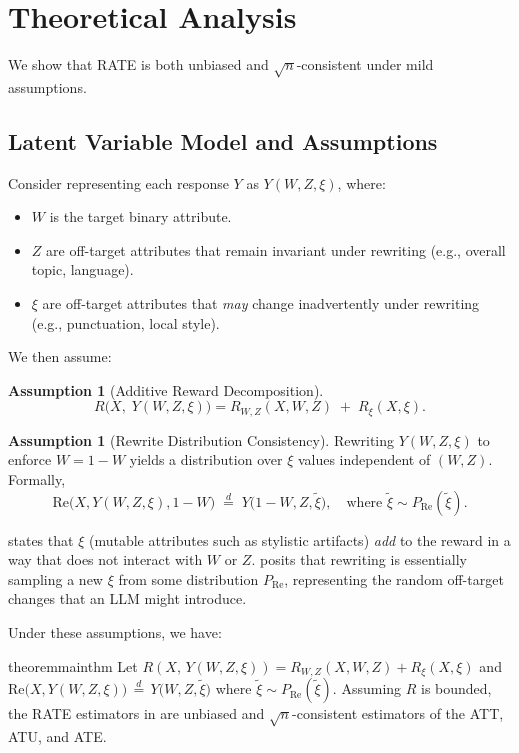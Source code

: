 \documentclass{article}
\theoremstyle{definition}
\newtheorem{assumption}[theorem]{Assumption}
\begin{document}
\section{Theoretical Analysis}
\label{sec:theory}

We show that RATE is both unbiased and $\sqrt{n}$-consistent under mild assumptions.

\subsection{Latent Variable Model and Assumptions}

Consider representing each response $Y$ as $Y(W, Z, \xi)$, where:
\begin{itemize}
    \item $W$ is the target binary attribute.
    \item $Z$ are off-target attributes that remain invariant under rewriting (e.g., overall topic, language).
    \item $\xi$ are off-target attributes that \emph{may} change inadvertently under rewriting (e.g., punctuation, local style).
\end{itemize}
We then assume:

\begin{assumption}[Additive Reward Decomposition]
\label{assump:additive}
\[
R\bigl(X,\;Y(W,Z,\xi)\bigr) = R_{W,Z}(X,W,Z) \;+\; R_{\xi}(X,\xi).
\]
\end{assumption}
\begin{assumption}[Rewrite Distribution Consistency]
\label{assump:rewrite_dist}
Rewriting $Y(W,Z,\xi)$ to enforce $W=1-W$ yields a distribution over $\xi$ values independent of $(W,Z)$. Formally,
\[
\text{Re}\bigl(X, Y(W,Z,\xi), 1 - W \bigr) \;\stackrel{d}{=}\; Y\bigl(1 - W,Z,\tilde{\xi}\bigr),
\quad\text{where } \tilde{\xi} \sim P_{\mathrm{Re}}(\tilde{\xi}).
\]
\end{assumption}
\noindent
{} states that $\xi$ (mutable attributes such as stylistic artifacts) \emph{add} to the reward in a way that does not interact with $W$ or $Z$.  posits that rewriting is essentially sampling a new $\xi$ from some distribution $P_{\mathrm{Re}}$, representing the random off-target changes that an LLM might introduce.

Under these assumptions, we have:

\begin{restatable}{theorem}{mainthm}
\label{thm:mainthm}
Let $R(X,\,Y(W,Z,\xi)) = R_{W,Z}(X,W,Z) + R_{\xi}(X,\xi)$ and
\(
\text{Re}\bigl(X, Y(W,Z,\xi)\bigr) \,\stackrel{d}{=}\, Y\bigl(W,Z,\tilde{\xi}\bigr)
\)
where
\(
\tilde{\xi} \sim P_{\mathrm{Re}}(\tilde{\xi})
\).
Assuming $R$ is bounded, the RATE estimators in  are unbiased and $\sqrt{n}$-consistent estimators of the ATT, ATU, and ATE.
\end{restatable}
\end{document}
